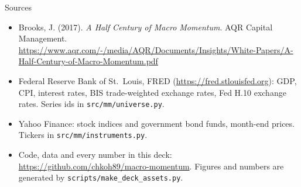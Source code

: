 \documentclass[aspectratio=169,10pt]{beamer}
\begin{document}
\begin{frame}{Sources}
  \small
  \begin{itemize}
    \item Brooks, J. (2017). \emph{A Half Century of Macro Momentum}. AQR Capital Management.
          \url{https://www.aqr.com/-/media/AQR/Documents/Insights/White-Papers/A-Half-Century-of-Macro-Momentum.pdf}
    \item Federal Reserve Bank of St.\ Louis, FRED (\url{https://fred.stlouisfed.org}): GDP, CPI, interest rates,
          BIS trade-weighted exchange rates, Fed H.10 exchange rates. Series ids in \texttt{src/mm/universe.py}.
    \item Yahoo Finance: stock indices and government bond funds, month-end prices.
          Tickers in \texttt{src/mm/instruments.py}.
    \item Code, data and every number in this deck: \url{https://github.com/chkoh89/macro-momentum}.
          Figures and numbers are generated by \texttt{scripts/make\_deck\_assets.py}.
  \end{itemize}
\end{frame}
\end{document}
